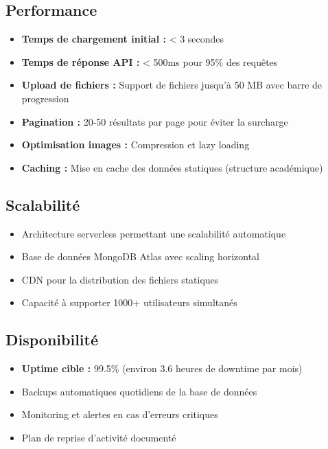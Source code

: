 \documentclass[12pt,a4paper]{article}
\begin{document}
\subsection{Performance}

\begin{itemize}[leftmargin=*]
    \item \textbf{Temps de chargement initial :} < 3 secondes
    \item \textbf{Temps de réponse API :} < 500ms pour 95\% des requêtes
    \item \textbf{Upload de fichiers :} Support de fichiers jusqu'à 50 MB avec barre de progression
    \item \textbf{Pagination :} 20-50 résultats par page pour éviter la surcharge
    \item \textbf{Optimisation images :} Compression et lazy loading
    \item \textbf{Caching :} Mise en cache des données statiques (structure académique)
\end{itemize}

\subsection{Scalabilité}

\begin{itemize}[leftmargin=*]
    \item Architecture serverless permettant une scalabilité automatique
    \item Base de données MongoDB Atlas avec scaling horizontal
    \item CDN pour la distribution des fichiers statiques
    \item Capacité à supporter 1000+ utilisateurs simultanés
\end{itemize}

\subsection{Disponibilité}

\begin{itemize}[leftmargin=*]
    \item \textbf{Uptime cible :} 99.5\% (environ 3.6 heures de downtime par mois)
    \item Backups automatiques quotidiens de la base de données
    \item Monitoring et alertes en cas d'erreurs critiques
    \item Plan de reprise d'activité documenté
\end{itemize}
\end{document}
